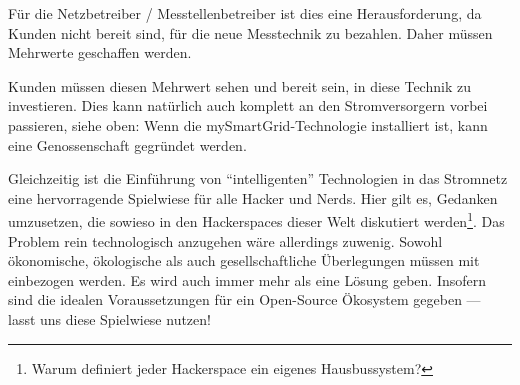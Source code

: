 \documentclass[12pt,BCOR=8.5mm]{scrartcl}
\begin{document}
Für die Netzbetreiber / Messtellenbetreiber ist dies eine
Herausforderung, da Kunden nicht bereit sind, für die neue Messtechnik
zu bezahlen. Daher müssen Mehrwerte geschaffen werden.

Kunden müssen diesen Mehrwert sehen und bereit sein, in diese Technik zu
investieren. Dies kann natürlich auch komplett an den Stromversorgern
vorbei passieren, siehe oben: Wenn die mySmartGrid-Technologie
installiert ist, kann eine Genossenschaft gegründet werden.

Gleichzeitig ist die Einführung von "`intelligenten"' Technologien in
das Stromnetz eine hervorragende Spielwiese für alle Hacker und Nerds.
Hier gilt es, Gedanken umzusetzen, die sowieso in den Hackerspaces
dieser Welt diskutiert werden\footnote{Warum definiert jeder Hackerspace
ein eigenes Hausbussystem?}. Das Problem rein technologisch anzugehen
wäre allerdings zuwenig. Sowohl ökonomische, ökologische als auch
gesellschaftliche Überlegungen müssen mit einbezogen werden. Es wird
auch immer mehr als eine Lösung geben. Insofern sind die idealen
Voraussetzungen für ein Open-Source Ökosystem gegeben --- lasst uns diese
Spielwiese nutzen!

\cite{geller2010smartgrid}


%
%
%
%
%
%


\end{document}
